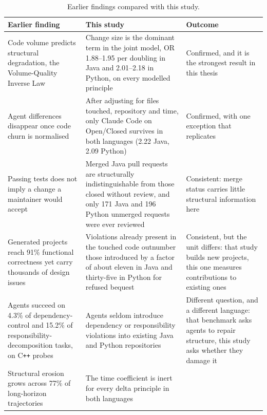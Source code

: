 \begin{table}[p]
\centering
\caption{Earlier findings compared with this study.}
\label{tab:sota-comparison}
\footnotesize
\begin{tabular}{@{}>{\raggedright\arraybackslash}p{3.5cm}
                  >{\raggedright\arraybackslash}p{4.6cm}
                  >{\raggedright\arraybackslash}p{4.9cm}@{}}
\toprule
\textbf{Earlier finding} & \textbf{This study} & \textbf{Outcome} \\
\midrule
Code volume predicts structural degradation, the Volume-Quality Inverse Law
\citep{zhu2026smells} &
Change size is the dominant term in the joint model, OR 1.88--1.95 per doubling in Java and
2.01--2.18 in Python, on every modelled principle &
Confirmed, and it is the strongest result in this thesis \\
\addlinespace
Agent differences disappear once code churn is normalised \citep{cynthia2026postmerge} &
After adjusting for files touched, repository and time, only Claude Code on Open/Closed survives in
both languages (2.22 Java, 2.09 Python) &
Confirmed, with one exception that replicates \\
\addlinespace
Passing tests does not imply a change a maintainer would accept \citep{metr2026sweverified} &
Merged Java pull requests are structurally indistinguishable from those closed without review, and
only 171 Java and 196 Python unmerged requests were ever reviewed &
Consistent: merge status carries little structural information here \\
\addlinespace
Generated projects reach 91\% functional correctness yet carry thousands of design issues
\citep{beyond2026designissues} &
Violations already present in the touched code outnumber those introduced by a factor of about
eleven in Java and thirty-five in Python for refused bequest &
Consistent, but the unit differs: that study builds new projects, this one measures contributions to
existing ones \\
\addlinespace
Agents succeed on 4.3\% of dependency-control and 15.2\% of responsibility-decomposition tasks, on
C\texttt{++} probes \citep{zhu2026nitr} &
Agents seldom introduce dependency or responsibility violations into existing Java and Python
repositories &
Different question, and a different language: that benchmark asks agents to repair structure, this
study asks whether they damage it \\
\addlinespace
Structural erosion grows across 77\% of long-horizon trajectories \citep{slopcodebench2026} &
The time coefficient is inert for every delta principle in both languages &

\end{tabular}
\end{table}
